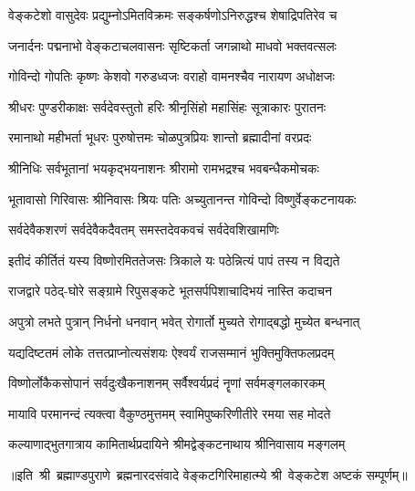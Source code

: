 

\twolineshloka
{वेङ्कटेशो वासुदेवः प्रद्युम्नोऽमितविक्रमः}
{सङ्कर्षणोऽनिरुद्धश्च शेषाद्रिपतिरेव च}

\twolineshloka
{जनार्दनः पद्मनाभो वेङ्कटाचलवासनः}
{सृष्टिकर्ता जगन्नाथो माधवो भक्तवत्सलः}

\twolineshloka
{गोविन्दो गोपतिः कृष्णः केशवो गरुडध्वजः}
{वराहो वामनश्चैव नारायण अधोक्षजः}

\twolineshloka
{श्रीधरः पुण्डरीकाक्षः सर्वदेवस्तुतो हरिः}
{श्रीनृसिंहो महासिंहः सूत्राकारः पुरातनः}

\twolineshloka
{रमानाथो महीभर्ता भूधरः पुरुषोत्तमः}
{चोळपुत्रप्रियः शान्तो ब्रह्मादीनां वरप्रदः}

\twolineshloka
{श्रीनिधिः सर्वभूतानां भयकृद्भयनाशनः}
{श्रीरामो रामभद्रश्च भवबन्धैकमोचकः}

\twolineshloka
{भूतावासो गिरिवासः श्रीनिवासः श्रियः पतिः}
{अच्युतानन्त गोविन्दो विष्णुर्वेङ्कटनायकः}

\twolineshloka
{सर्वदेवैकशरणं सर्वदेवैकदैवतम्}
{समस्तदेवकवचं सर्वदेवशिखामणिः}

\twolineshloka
{इतीदं कीर्तितं यस्य विष्णोरमिततेजसः}
{त्रिकाले यः पठेन्नित्यं पापं तस्य न विद्यते}

\twolineshloka
{राजद्वारे पठेद्-घोरे सङ्ग्रामे रिपुसङ्कटे}
{भूतसर्पपिशाचादिभयं नास्ति कदाचन}

\twolineshloka
{अपुत्रो लभते पुत्रान् निर्धनो धनवान् भवेत्}
{रोगार्तो मुच्यते रोगाद्बद्धो मुच्येत बन्धनात्}

\twolineshloka
{यद्यदिष्टतमं लोके तत्तत्प्राप्नोत्यसंशयः}
{ऐश्वर्यं राजसम्मानं भुक्तिमुक्तिफलप्रदम्}

\twolineshloka
{विष्णोर्लोकैकसोपानं सर्वदुःखैकनाशनम्}
{सर्वैश्वर्यप्रदं नॄणां सर्वमङ्गलकारकम्}

\twolineshloka
{मायावि परमानन्दं त्यक्त्वा वैकुण्ठमुत्तमम्}
{स्वामिपुष्करिणीतीरे रमया सह मोदते}

\twolineshloka
{कल्याणाद्भुतगात्राय कामितार्थप्रदायिने}
{श्रीमद्वेङ्कटनाथाय श्रीनिवासाय मङ्गलम्}

॥इति~श्री~ब्रह्माण्डपुराणे~ब्रह्मनारदसंवादे वेङ्कटगिरिमाहात्म्ये श्री~वेङ्कटेश अष्टकं सम्पूर्णम्॥